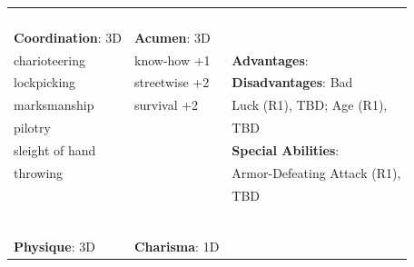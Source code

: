 \documentclass[10pt]{article}
\begin{document}
\begin{table}
\begin{tabular}{m{156pt} m{156pt} m{156pt}}
 \hrulefill &  \hrulefill & \\

 \hrulefill &  \hrulefill & \\

 \hrulefill &  \hrulefill & \\

 \hrulefill &  \hrulefill & \\


\textbf{Coordination}: 3D \hrulefill & \textbf{Acumen}: 3D \hrulefill     & \hrulefill \\

charioteering        \hrulefill & know-how          +1 \hrulefill & \textbf{Advantages}: \hrulefill \\

lockpicking          \hrulefill & streetwise        +2 \hrulefill & \textbf{Disadvantages}: Bad \hrulefill \\

marksmanship         \hrulefill & survival          +2 \hrulefill & Luck (R1), TBD; Age (R1), \hrulefill \\

pilotry              \hrulefill &  \hrulefill & TBD \hrulefill \\

sleight of hand      \hrulefill &  \hrulefill & \textbf{Special Abilities}: \hrulefill \\

throwing             \hrulefill &  \hrulefill & Armor-Defeating Attack (R1), \hrulefill \\

 \hrulefill &  \hrulefill & TBD \hrulefill \\

 \hrulefill &  \hrulefill &  \hrulefill \\

 \hrulefill &  \hrulefill &  \hrulefill \\

 \hrulefill &  \hrulefill &  \hrulefill \\

 \hrulefill &  \hrulefill &  \hrulefill \\

 \hrulefill &  \hrulefill &  \hrulefill \\

 \hrulefill &  \hrulefill &  \hrulefill \\


\textbf{Physique}: 3D \hrulefill & \textbf{Charisma}: 1D \hrulefill     &  \hrulefill \\


\end{tabular}
\end{table}
\end{document}
